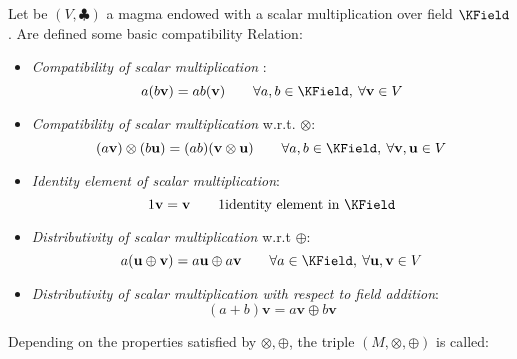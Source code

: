 \documentclass[a4paper,12pt]{scrartcl}    %
\newcommand{\OpA}{\otimes}
\newcommand{\OpB}{\oplus}
\begin{document}
Let be $(V, \clubsuit)$ a magma endowed with a scalar multiplication over field $\KField$.
Are defined some basic compatibility  Relation:
\begin{itemize}
\item \emph{Compatibility of scalar multiplication} :
	\begin{equation}\label{scalarmulti}
		a ( b \mathbf{v} ) = ab (\mathbf{v}) \qquad \forall a,b \in \KField,\: \forall \mathbf{v} \in V
	\end{equation}
\item \emph{Compatibility of scalar multiplication} w.r.t. $\OpA$:
	\begin{equation}\label{scalarcompat}
		 (a \mathbf{v} ) \OpA (b \mathbf{u)}= (ab) (\mathbf{v}\OpA \mathbf{u}) \qquad 
		 \forall a,b \in \KField,\: \forall \mathbf{v},\mathbf{u} \in V
	\end{equation}
\item \emph{Identity element of scalar multiplication}:
	\begin{equation}\label{scalaridentity}
		1 \mathbf{v} = \mathbf{v}  \qquad 1 \textrm{identity element in $\KField$}
	\end{equation}
\item \emph{Distributivity of scalar multiplication} w.r.t $\OpB$:
	\begin{equation}\label{scalarDistributivityA}
		a ( \mathbf{u} \OpB \mathbf{v} ) = a \mathbf{u} \OpB a \mathbf{v} \qquad \forall a \in\KField,\: \forall \mathbf{u},\mathbf{v}\in V
	\end{equation}
\item \emph{Distributivity of scalar multiplication with respect to field addition}:
	\begin{equation}\label{scalarDistributivityB}
		(a +b ) \mathbf{v} = a  \mathbf{v}  \OpB  b \mathbf{v}
	\end{equation}
\end{itemize}

Depending on the properties satisfied by $\OpA,\OpB$, the triple $(M,\OpA,\OpB)$ is called:
\end{document}

